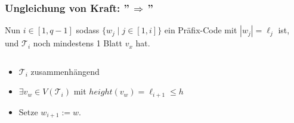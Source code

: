 \documentclass{beamer}
\begin{document}
\begin{frame}[t]
\begin{columns}
\begin{column}{0.5\textwidth}
{\begin{center}
            \end{center}
            }
    \end{column}
    \end{columns}
\end{frame}

\begin{frame}[t]
    \frametitle{Ungleichung von Kraft: ''$\,\Longrightarrow\,$''}
    Nun $i \in [1,q-1]$ sodass $\{w_j \mid j \in [1,i]\}$ ein Präfix-Code
    mit $|w_j| = \ell_j$ ist, und $\mathcal{T}_i$ noch mindestens 1 Blatt $v_x$ hat.\\[10pt]\pause

    \begin{columns}
    \begin{column}{0.77\textwidth}
        \begin{itemize}
            \item $\mathcal{T}_i$ zusammenhängend\\[10pt]
            \item $\exists v_w \in V(\mathcal{T}_i)$ mit $height(v_w) = \ell_{i+1} \leq h$\\[10pt]
            \item Setze $w_{i+1} := w$.
        \end{itemize}
    \end{column}
    \begin{column}{0.23\textwidth}\onslide
        \begin{center}
        \end{center}
    \end{column}
    \end{columns}
\end{frame}
\end{document}
